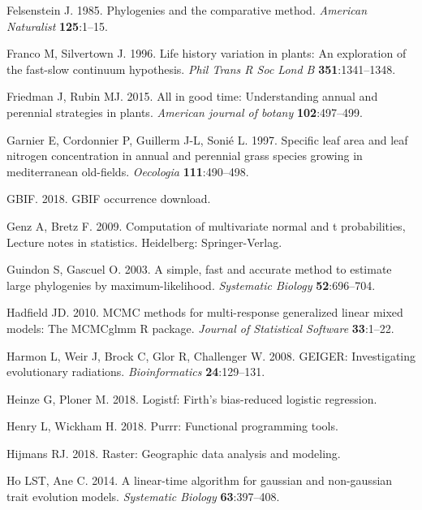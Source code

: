 \documentclass[man,floatsintext]{apa6}
\theoremstyle{definition}
\theoremstyle{definition}
\theoremstyle{definition}
\theoremstyle{remark}
\begin{document}
\leavevmode\hypertarget{ref-felsenstein1985phylogenies}{}%
Felsenstein J. 1985. Phylogenies and the comparative method.
\emph{American Naturalist} \textbf{125}:1--15.

\leavevmode\hypertarget{ref-franco1996life}{}%
Franco M, Silvertown J. 1996. Life history variation in plants: An
exploration of the fast-slow continuum hypothesis. \emph{Phil Trans R
Soc Lond B} \textbf{351}:1341--1348.

\leavevmode\hypertarget{ref-friedman2015all}{}%
Friedman J, Rubin MJ. 2015. All in good time: Understanding annual and
perennial strategies in plants. \emph{American journal of botany}
\textbf{102}:497--499.

\leavevmode\hypertarget{ref-garnier1997specific}{}%
Garnier E, Cordonnier P, Guillerm J-L, Sonié L. 1997. Specific leaf area
and leaf nitrogen concentration in annual and perennial grass species
growing in mediterranean old-fields. \emph{Oecologia}
\textbf{111}:490--498.

\leavevmode\hypertarget{ref-gbifdownload}{}%
GBIF. 2018. GBIF occurrence download.

\leavevmode\hypertarget{ref-R-mvtnorm}{}%
Genz A, Bretz F. 2009. Computation of multivariate normal and t
probabilities, Lecture notes in statistics. Heidelberg: Springer-Verlag.

\leavevmode\hypertarget{ref-guindon2003a}{}%
Guindon S, Gascuel O. 2003. A simple, fast and accurate method to
estimate large phylogenies by maximum-likelihood. \emph{Systematic
Biology} \textbf{52}:696--704.

\leavevmode\hypertarget{ref-R-MCMCglmm}{}%
Hadfield JD. 2010. MCMC methods for multi-response generalized linear
mixed models: The MCMCglmm R package. \emph{Journal of Statistical
Software} \textbf{33}:1--22.

\leavevmode\hypertarget{ref-R-geiger_d}{}%
Harmon L, Weir J, Brock C, Glor R, Challenger W. 2008. GEIGER:
Investigating evolutionary radiations. \emph{Bioinformatics}
\textbf{24}:129--131.

\leavevmode\hypertarget{ref-R-logistf}{}%
Heinze G, Ploner M. 2018. Logistf: Firth's bias-reduced logistic
regression.

\leavevmode\hypertarget{ref-R-purrr}{}%
Henry L, Wickham H. 2018. Purrr: Functional programming tools.

\leavevmode\hypertarget{ref-R-raster}{}%
Hijmans RJ. 2018. Raster: Geographic data analysis and modeling.

\leavevmode\hypertarget{ref-R-phylolm}{}%
Ho LST, Ane C. 2014. A linear-time algorithm for gaussian and
non-gaussian trait evolution models. \emph{Systematic Biology}
\textbf{63}:397--408.
\end{document}
